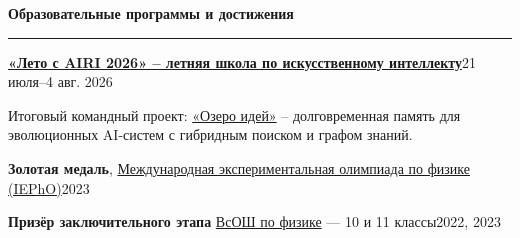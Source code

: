 \documentclass[10pt,a4paper]{article}
\newcommand{\sectiontitle}[1]{%
  \vspace{0.38em}%
  {\normalsize\bfseries\color{accent} #1}\par
  \vspace{0.08em}\hrule\vspace{0.21em}%
}
\newcommand{\entry}[4]{%
  \textbf{#1}\hfill {\color{textgray}#2}\par
  {\color{textgray}#3}\par
  #4\vspace{0.21em}%
}
\newcommand{\achievement}[2]{%
  #1\hfill{\color{textgray}#2}\par
}
\begin{document}
\sectiontitle{Образовательные программы и достижения}
\entry{\href{https://airi.net/ru/summer-school-2026/}{«Лето с AIRI 2026» -- летняя школа по искусственному интеллекту}}{21 июля--4 авг. 2026}{Итоговый командный проект: \href{https://github.com/n4rly-boop/ideas-lake}{«Озеро идей»} -- долговременная память для эволюционных AI-систем с гибридным поиском и графом знаний.}{}
\achievement{\textbf{Золотая медаль}, \href{https://iepho.ru/}{Международная экспериментальная олимпиада по физике (IEPhO)}}{2023}
\achievement{\textbf{Призёр заключительного этапа} \href{https://vos.olimpiada.ru/}{ВсОШ по физике} — 10 и 11 классы}{2022, 2023}
\end{document}

